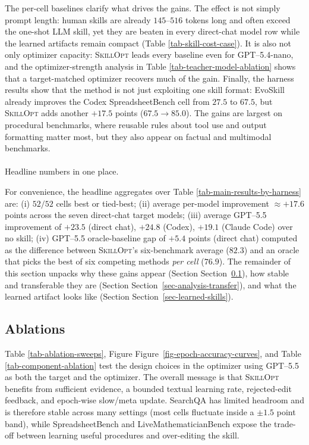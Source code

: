 \documentclass[
]{article}
\makeatletter
\let\oldparagraph\paragraph
\renewcommand{\paragraph}{
    \@ifstar
      \xxxParagraphStar
      \xxxParagraphNoStar
  }
\newcommand{\xxxParagraphStar}[1]{\oldparagraph*{#1}\mbox{}}
\newcommand{\xxxParagraphNoStar}[1]{\oldparagraph{#1}\mbox{}}
\newcommand{\ourmethod}{\textsc{SkillOpt}\xspace}
\makeatother
\begin{document}
The per-cell baselines clarify what drives the gains. The effect is not
simply prompt length: human skills are already \(145\)--\(516\) tokens
long and often exceed the one-shot LLM skill, yet they are beaten in
every direct-chat model row while the learned artifacts remain compact
(Table \ref{tab-skill-cost-case}). It is also not only optimizer
capacity: \ourmethod{} leads every baseline even for GPT--5.4-nano, and
the optimizer-strength analysis in Table
\ref{tab-teacher-model-ablation} shows that a target-matched optimizer
recovers much of the gain. Finally, the harness results show that the
method is not just exploiting one skill format: EvoSkill already
improves the Codex SpreadsheetBench cell from \(27.5\) to \(67.5\), but
\ourmethod{} adds another \(+17.5\) points (\(67.5{\to}85.0\)). The
gains are largest on procedural benchmarks, where reusable rules about
tool use and output formatting matter most, but they also appear on
factual and multimodal benchmarks.

\paragraph{Headline numbers in one
place.}\label{headline-numbers-in-one-place.}

For convenience, the headline aggregates over Table
\ref{tab-main-results-by-harness} are: (i) \textbf{$52/52$} cells best
or tied-best; (ii) average per-model improvement \(\approx +17.6\)
points across the seven direct-chat target models; (iii) average
GPT--5.5 improvement of \(+23.5\) (direct chat), \(+24.8\) (Codex),
\(+19.1\) (Claude Code) over no skill; (iv) GPT--5.5 oracle-baseline gap
of \(+5.4\) points (direct chat) computed as the difference between
\ourmethod{}'s six-benchmark average (\(82.3\)) and an oracle that picks
the best of six competing methods \emph{per cell} (\(76.9\)). The
remainder of this section unpacks why these gains appear (Section
Section~\ref{sec-optimizer-ablation}), how stable and transferable they
are (Section Section~\ref{sec-analysis-transfer}), and what the learned
artifact looks like (Section Section~\ref{sec-learned-skills}).

\subsection{Ablations}\label{sec-optimizer-ablation}

Table \ref{tab-ablation-sweeps}, Figure
Figure~\ref{fig-epoch-accuracy-curves}, and Table
\ref{tab-component-ablation} test the design choices in the optimizer
using GPT--5.5 as both the target and the optimizer. The overall message
is that \ourmethod{} benefits from sufficient evidence, a bounded
textual learning rate, rejected-edit feedback, and epoch-wise slow/meta
update. SearchQA has limited headroom and is therefore stable across
many settings (most cells fluctuate inside a \(\pm1.5\) point band),
while SpreadsheetBench and LiveMathematicianBench expose the trade-off
between learning useful procedures and over-editing the skill.
\end{document}
